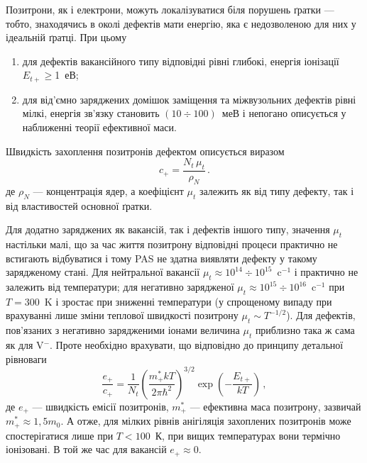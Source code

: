Позитрони, як і електрони, можуть локалізуватися біля порушень ґратки --- тобто, знаходячись в околі дефектів мати енергію,
яка є недозволеною для них у ідеальній ґратці.
При цьому
\begin{enumerate}[label=\asbuk*),leftmargin=0em,itemindent=1.5em]
\item для дефектів вакансійного типу відповідні рівні глибокі, енергія іонізації $E_{t+}\geq$1~еВ;
\item для від'ємно заряджених домішок заміщення та міжвузольних дефектів рівні мілкі,
 енергія зв'язку становить $(10\div100)$~меВ і
непогано описується у наближенні теорії ефективної маси.
\end{enumerate}

Швидкість захоплення позитронів дефектом описується виразом
\begin{equation}\label{PASc}
c_+=\frac{N_t\,\mu_t}{\rho_N}\,.
\end{equation}
де
$\rho_N$ --- концентрація ядер,
а коефіцієнт $\mu_t$ залежить як від типу дефекту, так і від властивостей основної ґратки.

Для додатно заряджених як вакансій, так і дефектів іншого типу, значення $\mu_t$
настільки малі, що за час життя позитрону відповідні процеси практично не встигають відбуватися і тому
PAS не здатна виявляти дефекту у такому зарядженому стані.
Для нейтральної вакансії $\mu_t\approx10^{14}\div10^{15}$~c$^{-1}$ і практично не залежить від температури;
для негативно зарядженої $\mu_t\approx10^{15}\div10^{16}$~c$^{-1}$ при $T=300$~K і зростає при
зниженні температури (у спрощеному випаду при врахуванні лише зміни теплової швидкості
позитрону $\mu_t\sim T^{-1/2}$).
Для дефектів, пов'язаних з негативно зарядженими іонами величина $\mu_t$ приблизно така ж сама
як для V$^-$.
Проте необхідно врахувати, що відповідно до принципу детальної рівноваги
\begin{equation}\label{PASce}
\frac{e_+}{c_+}=\frac{1}{N_t}\left(\frac{m_+^*kT}{2\pi\hbar^2}\right)^{3/2}\exp\left(-\frac{E_{t+}}{kT}\right)\,,
\end{equation}
де
$e_+$ --- швидкість емісії позитронів,
$m_+^*$ --- ефективна маса позитрону, зазвичай $m_+^*\approx1,5 m_0$.
А отже, для мілких рівнів анігіляція захоплених позитронів може спостерігатися лише при
$T<100$~К, при вищих температурах вони термічно іонізовані.
В той же час для вакансій $e_+\approx0$.

